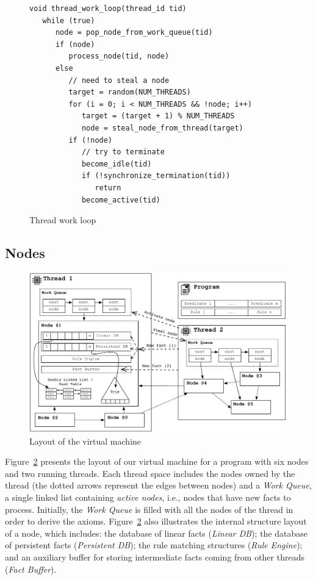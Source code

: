 \begin{figure}[ht]
{\footnotesize
\begin{Verbatim}
void thread_work_loop(thread_id tid)
   while (true)
      node = pop_node_from_work_queue(tid)
      if (node)
         process_node(tid, node)
      else
         // need to steal a node
         target = random(NUM_THREADS)
         for (i = 0; i < NUM_THREADS && !node; i++)
            target = (target + 1) % NUM_THREADS
            node = steal_node_from_thread(target)
         if (!node)
            // try to terminate
            become_idle(tid)
            if (!synchronize_termination(tid))
               return
            become_active(tid)
\end{Verbatim}
}
\caption{Thread work loop}
\label{code:work_loop}
\end{figure}


\subsection{Nodes}

\begin{figure}[t]
\centering
\includegraphics[width=\textwidth]{figures/overview.pdf}
\caption{Layout of the virtual machine}
\label{fig:overview}
\end{figure}

Figure~\ref{fig:overview} presents the layout of our virtual machine
for a program with six nodes and two running threads. Each thread
space includes the nodes owned by the thread (the dotted arrows
represent the edges between nodes) and a \emph{Work Queue}, a single
linked list containing \emph{active nodes}, i.e., nodes that have new
facts to process. Initially, the \emph{Work Queue} is filled with all
the nodes of the thread in order to derive the
axioms. Figure~\ref{fig:overview} also illustrates the internal
structure layout of a node, which includes: the database of linear
facts (\emph{Linear DB}); the database of persistent facts
(\emph{Persistent DB}); the rule matching structures (\emph{Rule
Engine}); and an auxiliary buffer for storing intermediate facts
coming from other threads (\emph{Fact Buffer}).

